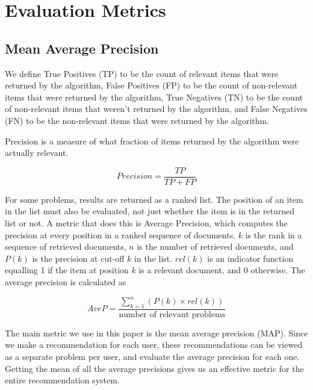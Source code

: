 \section{Evaluation Metrics}

\subsection{Mean Average Precision}

We define True Positives (TP) to be the count of relevant items that were returned by the algorithm, False Positives (FP) to be the count of non-relevant items that were returned by the algorithm, True Negatives (TN) to be the count of non-relevant items that weren't returned by the algorithm, and False Negatives (FN) to be the non-relevant items that were returned by the algorithm.

Precision is a measure of what fraction of items returned by the algorithm were actually relevant.

\[
Precision = \frac {TP} {TP + FP}
\]

For some problems, results are returned as a ranked list. The position of an item in the list must also be evaluated, not just whether the item is in the returned list or not. A metric that does this is Average Precision, which computes the precision at every position in a ranked sequence of documents. $k$ is the rank in a sequence of retrieved documents, $n$ is the number of retrieved documents, and $P(k)$ is the precision at cut-off $k$ in the list. $rel(k)$ is an indicator function equalling 1 if the item at position $k$ is a relevant document, and 0 otherwise. The average precision is calculated as

\[
AveP = \frac{\sum_{k=1}^n(P(k) \times rel(k))}{\text{number of relevant problems}}
\]

The main metric we use in this paper is the mean average precision (MAP). Since we make a recommendation for each user, these recommendations can be viewed as a separate problem per user, and evaluate the average precision for each one. Getting the mean of all the average precisions gives us an effective metric for the entire recommendation system.

